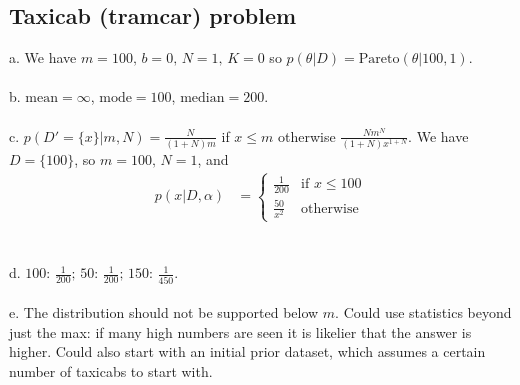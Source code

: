 \subsection{Taxicab (tramcar) problem}
a. We have $m=100,\, b=0,\, N=1,\, K=0$ so $p(\theta|D) = \mathrm{Pareto}(\theta|100, 1)$.\\\\
b. $\mathrm{mean} = \infty$, $\mathrm{mode} = 100$, $\mathrm{median} = 200$.\\\\
c. $p(D'=\{x\}|m,N) = \frac{N}{(1+N)m}$ if $x\leq m$ otherwise $\frac{Nm^N}{(1+N)x^{1+N}}$. We have $D=\{100\}$, so $m=100,\,N=1$, and
\begin{align*}
p(x|D,\alpha) &= \begin{cases}
\frac{1}{200} &\text{if $x\leq100$}\\
\frac{50}{x^{2}} &\text{otherwise}
\end{cases}
\end{align*}\\\\
d. $100:\,\frac{1}{200};\,50:\,\frac{1}{200};\,150:\,\frac{1}{450}$.\\\\
e. The distribution should not be supported below $m$. Could use statistics beyond just the max: if many high numbers are seen it is likelier that the answer is higher. Could also start with an initial prior dataset, which assumes a certain number of taxicabs to start with.

